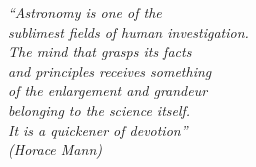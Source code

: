 \documentclass[
	12pt,				%
	openany,			%
	oneside,			%
	a4paper,			%
	english,			%
	brazil				%
	]{abntex2}
\begin{document}

\frenchspacing 


\imprimircapa

\imprimirfolhaderosto*

\begin{epigrafe}
    \vspace*{\fill}
	\begin{flushright}
		\textit{``Astronomy is one of the \\ sublimest fields of human investigation. \\ The mind that grasps its facts \\ and principles receives something \\ of the enlargement and grandeur \\ belonging to the science itself. \\ It is a quickener of devotion'' \\
		(Horace Mann)}
	\end{flushright}
\end{epigrafe}
\end{document}
